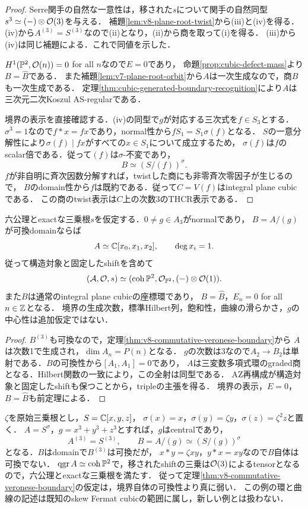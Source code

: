 \documentclass[11pt,a4paper]{ltjsarticle}
\begin{document}
\begin{proof}
Serre関手の自然な一意性は，移された$s$について関手の自然同型
$s^3\simeq(-)\otimes\mathcal O(3)$を与える．
補題\ref{lem:v8-plane-root-twist}から(iii)と(iv)を得る．
(iv)から$A^{(3)}=S^{(3)}$なので(ii)となり，(ii)から商を取って(i)を得る．
(iii)から(iv)は同じ補題による．これで同値を示した．

$H^1(\mathbb P^2,\mathcal O(n))=0$ for all $n$なので$E=0$であり，
命題\ref{prop:cubic-defect-mass}より$B=\widehat B$である．
また補題\ref{lem:v7-plane-root-orbit}から$A$は一次生成なので，商$B$も一次生成である．
定理\ref{thm:cubic-generated-boundary-recognition}により$A$は三次元二次Koszul AS-regularである．

境界の表示を直接確認する．(iv)の同型で$g$が対応する三次式を$f\in S_3$とする．
$\sigma^3=1$なので$f*x=fx$であり，normal性から$fS_1=S_1\sigma(f)$となる．
$S$の一意分解性により$\sigma(f)\mid fx$がすべての$x\in S_1$について成立するため，
$\sigma(f)$は$f$のscalar倍である．従って$(f)$は$\sigma$-不変であり，
\[
 B\simeq(S/(f))^\sigma.
\]
$f$が非自明に斉次因数分解すれば，twistした商にも非零斉次零因子が生じるので，
$B$のdomain性から$f$は既約である．従って$C=V(f)$はintegral plane cubicである．
この商のtwist表示は$C$上の次数3のTHCR表示である．
\end{proof}

\begin{theorem}[可換な整三次normal境界からの完全な認識]
\label{thm:v7-commutative-cubic-recognition}
六公理とexactな三乗根$s$を仮定する．$0\ne g\in A_3$がnormalであり，
$B=A/(g)$が可換domainならば
\[
 A\simeq\mathbb C[x_0,x_1,x_2],\qquad\deg x_i=1.
\]
従って構造対象と固定したshiftを含めて
\[
 (\mathcal A,\mathcal O,s)\simeq
 (\operatorname{coh}\mathbb P^2,\mathcal O_{\mathbb P^2},(-)\otimes\mathcal O(1)).
\]
また$B$は通常のintegral plane cubicの座標環であり，
$B=\widehat B$，$E_n=0$ for all $n\in\mathbb Z$となる．
境界の生成次数，標準Hilbert列，飽和性，曲線の滑らかさ，$g$の中心性は追加仮定ではない．
\end{theorem}
\begin{proof}
$B^{(3)}$も可換なので，定理\ref{thm:v8-commutative-veronese-boundary}から
$A$は次数1で生成され，$\dim A_n=P(n)$となる．
$g$の次数は3なので$A_2\to B_2$は単射である．$B$の可換性から$[A_1,A_1]=0$であり，
$A$は三変数多項式環のgraded商となる．Hilbert関数の一致により，この全射は同型である．
AZ再構成が構造対象と固定したshiftも保つことから，tripleの主張を得る．
境界の表示，$E=0$，$B=\widehat B$も前定理による．
\end{proof}

\begin{example}[第三Veroneseだけが可換な整三次境界]
\label{ex:v8-order-three-fermat}
$\zeta$を原始三乗根とし，$S=\mathbb C[x,y,z]$，
$\sigma(x)=x$，$\sigma(y)=\zeta y$，$\sigma(z)=\zeta^2z$と置く．
$A=S^\sigma$，$g=x^3+y^3+z^3$とすれば，$g$はcentralであり，
\[
 A^{(3)}=S^{(3)},\qquad
 B=A/(g)\simeq(S/(g))^\sigma
\]
となる．$B$はdomainで$B^{(3)}$は可換だが，
$x*y=\zeta xy$，$y*x=xy$なので$B$自体は可換でない．
$\operatorname{qgr} A\simeq\operatorname{coh}\mathbb P^2$で，移されたshiftの三乗は$\mathcal O(3)$によるtensorとなるので，六公理とexactな三乗根を満たす．
従って定理\ref{thm:v8-commutative-veronese-boundary}の仮定は，境界自体の可換性より真に弱い．
この例の環と曲線の記述は既知のskew Fermat cubicの範囲に属し，新しい例とは扱わない．
\end{example}
\end{document}
